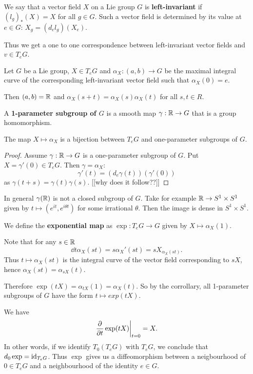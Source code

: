 \documentclass[11pt, english]{article}
\begin{document}
We say that a vector field $X$ on a Lie group $G$ is \textbf{left-invariant} if $(l_g)_\ast(X)=X$ for all $g \in G$. Such a vector field is determined by its value at $e \in G$: $X_g = (d_e l_g)(X_e)$.

Thus we get a one to one correspondence between left-invariant vector fields and $v \in T_eG$.
 
\begin{prop}
 Let $G$ be a Lie group, $X \in T_eG$ and $\alpha_X:(a,b) \to G$ be the maximal integral curve of the corresponding left-invariant vector field such that $\alpha_X(0)=e$.

Then $(a,b)=\mathbb{R}$ and $\alpha_X(s+t) = \alpha_X(s)\alpha_X(t)$ for all $s,t \in R$.
\end{prop}

A \textbf{1-parameter subgroup of $G$} is a smooth map $\gamma:\mathbb{R} \to G$ that is a group homomorphism.

\begin{corr}
 The map $X \mapsto \alpha_X$ is a bijection between $T_eG$ and one-parameter subgroups of $G$.
\end{corr}
\begin{proof}
 Assume $\gamma:\mathbb{R} \to G$ is a one-parameter subgroup of $G$. Put $X = \gamma'(0) \in T_eG$. Then $\gamma = \alpha_X$:
$$
\gamma'(t) = (d_e \gamma(t))(\gamma'(0))
$$
as $\gamma(t+s)=\gamma(t)\gamma(s)$. [[why does it follow??]]
\end{proof}

\begin{remark}
 In general $\gamma(\mathbb{R})$ is not a closed subgroup of $G$. Take for example $\mathbb{R} \to S^1 \times S^1$ given by $t \mapsto (e^{it},e^{i\theta t})$ for some irrational $\theta$. Then the image is dense in $S^1 \times S^1$.
\end{remark}

We define the \textbf{exponential map} as $\exp:T_e G \to G$ given by $X \mapsto \alpha_X(1)$. 

Note that for any $s \in \mathbb{R}$
$$
\dd{}{t} \alpha_X (st) = s \alpha_X'(st) = s X_{\alpha_X(st)}.
$$
Thus $t \mapsto \alpha_X(st)$ is the integral curve of the vector field corresponding to $sX$, hence $\alpha_X(st)= \alpha_{sX}(t)$. 

Therefore $\exp(tX)=\alpha_{tX}(1) = \alpha_X(t)$. So by the corrollary, all 1-parameter subgroups of $G$ have the form $t \mapsto exp(tX)$. 

We have
$$
\restr{\dd{}{t} \exp(tX)}{t=0} = X.
$$
In other words, if we identify $T_0(T_eG)$ with $T_eG$, we conclude that $d_0 \exp = \text{id}_{T_eG}$. Thus $\exp$ gives us a diffeomorphism between a neigbourhood of $0 \in T_eG$ and a neighbourhood of the identity $e \in G$.
\end{document}
